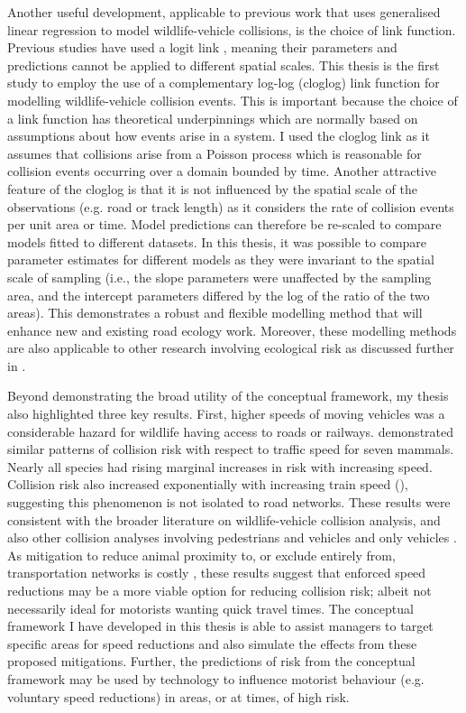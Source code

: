 Another useful development, applicable to previous work that uses generalised linear regression to model wildlife-vehicle collisions, is the choice of link function. Previous studies have used a logit link \citep[i.e. logistic regression, see ][]{seo15,gund98}, meaning their parameters and predictions cannot be applied to different spatial scales. This thesis is the first study to employ the use of a complementary log-log (cloglog) link function for modelling wildlife-vehicle collision events. This is important because the choice of a link function has theoretical underpinnings which are normally based on assumptions about how events arise in a system. I used the cloglog link as it assumes that collisions arise from a Poisson process which is reasonable for collision events occurring over a domain bounded by time. Another attractive feature of the cloglog is that it is not influenced by the spatial scale of the observations (e.g. road or track length) as it considers the rate of collision events per unit area or time. Model predictions can therefore be re-scaled to compare models fitted to different datasets. In this thesis, it was possible to compare parameter estimates for different models as they were invariant to the spatial scale of sampling (i.e., the slope parameters were unaffected by the sampling area, and the intercept parameters differed by the log of the ratio of the two areas). This demonstrates a robust and flexible modelling method that will enhance new and existing road ecology work. Moreover, these modelling methods are also applicable to other research involving ecological risk as discussed further in .

Beyond demonstrating the broad utility of the conceptual framework, my thesis also highlighted three key results. First, higher speeds of moving vehicles was a considerable hazard for wildlife having access to roads or railways.  demonstrated similar patterns of collision risk with respect to traffic speed for seven mammals. Nearly all species had rising marginal increases in risk with increasing speed. Collision risk also increased exponentially with increasing train speed (), suggesting this phenomenon is not isolated to road networks. These results were consistent with the broader literature on wildlife-vehicle collision analysis, and also other collision analyses involving pedestrians and vehicles \citep{rosen09} and only vehicles \citep{liu97}. As mitigation to reduce animal proximity to, or exclude entirely from, transportation networks is costly \citep{huij09}, these results suggest that enforced speed reductions may be a more viable option for reducing collision risk; albeit not necessarily ideal for motorists wanting quick travel times. The conceptual framework I have developed in this thesis is able to assist managers to target specific areas for speed reductions and also simulate the effects from these proposed mitigations. Further, the predictions of risk from the conceptual framework may be used by technology to influence motorist behaviour (e.g. voluntary speed reductions) in areas, or at times, of high risk.

